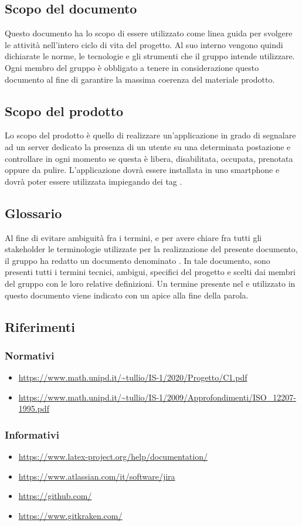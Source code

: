\subsection{Scopo del documento}
Questo documento ha lo scopo di essere utilizzato come linea guida per svolgere le attività nell'intero ciclo di vita del progetto.
Al suo interno vengono quindi dichiarate le norme, le tecnologie e gli strumenti che il gruppo \Gruppo{} intende utilizzare.
Ogni membro del gruppo è obbligato a tenere in considerazione questo documento al fine di garantire la massima coerenza del materiale prodotto.
	
\subsection{Scopo del prodotto}
Lo scopo del prodotto è quello di realizzare un’applicazione in grado di segnalare ad un server
dedicato la presenza di un utente su una determinata postazione e controllare in ogni momento
se questa è libera, disabilitata, occupata, prenotata oppure da pulire. L’applicazione dovrà essere
installata in uno smartphone  e dovrà poter essere utilizzata impiegando
dei tag .

\subsection{Glossario}
Al fine di evitare ambiguità fra i termini, e per avere chiare fra tutti gli stakeholder le terminologie utilizzate per la realizzazione del presente documento, il gruppo \Gruppo{} ha redatto un documento denominato \Gv.
In tale documento, sono presenti tutti i termini tecnici, ambigui, specifici del progetto e scelti dai membri del gruppo con le loro relative definizioni.
Un termine presente nel \Gv e utilizzato in questo documento viene indicato con un apice  alla fine della parola.

\subsection{Riferimenti} 
\subsubsection{Normativi}
\begin{itemize}
	\item \url{https://www.math.unipd.it/~tullio/IS-1/2020/Progetto/C1.pdf}
	\item \url{https://www.math.unipd.it/~tullio/IS-1/2009/Approfondimenti/ISO_12207-1995.pdf}
\end{itemize}

\subsubsection{Informativi}
\begin{itemize}
	\item \url{https://www.latex-project.org/help/documentation/}
	\item \url{https://www.atlassian.com/it/software/jira}
	\item \url{https://github.com/}
	\item \url{https://www.gitkraken.com/}
\end{itemize}